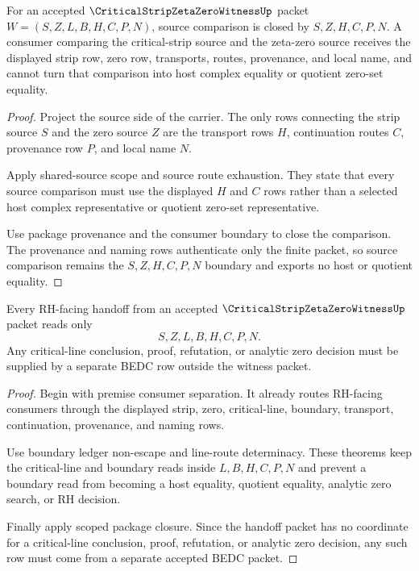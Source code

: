 \begin{theorem}
\label{thm:critical-strip-zeta-zero-source-boundary-closure}
For an accepted $\CriticalStripZetaZeroWitnessUp$ packet $W=(S,Z,L,B,H,C,P,N)$, source comparison is closed by $S,Z,H,C,P,N$. A consumer comparing the critical-strip source and the zeta-zero source receives the displayed strip row, zero row, transports, routes, provenance, and local name, and cannot turn that comparison into host complex equality or quotient zero-set equality.
\end{theorem}
\begin{proof}
Project the source side of the carrier. The only rows connecting the strip source $S$ and the zero source $Z$ are the transport rows $H$, continuation routes $C$, provenance row $P$, and local name $N$.

Apply shared-source scope and source route exhaustion. They state that every source comparison must use the displayed $H$ and $C$ rows rather than a selected host complex representative or quotient zero-set representative.

Use package provenance and the consumer boundary to close the comparison. The provenance and naming rows authenticate only the finite packet, so source comparison remains the $S,Z,H,C,P,N$ boundary and exports no host or quotient equality.
\end{proof}

\begin{theorem}
\label{thm:critical-strip-zeta-zero-rh-handoff-scope}
Every RH-facing handoff from an accepted $\CriticalStripZetaZeroWitnessUp$ packet reads only
$$
S,Z,L,B,H,C,P,N.
$$
Any critical-line conclusion, proof, refutation, or analytic zero decision must be supplied by a separate BEDC row outside the witness packet.
\end{theorem}
\begin{proof}
Begin with premise consumer separation. It already routes RH-facing consumers through the displayed strip, zero, critical-line, boundary, transport, continuation, provenance, and naming rows.

Use boundary ledger non-escape and line-route determinacy. These theorems keep the critical-line and boundary reads inside $L,B,H,C,P,N$ and prevent a boundary read from becoming a host equality, quotient equality, analytic zero search, or RH decision.

Finally apply scoped package closure. Since the handoff packet has no coordinate for a critical-line conclusion, proof, refutation, or analytic zero decision, any such row must come from a separate accepted BEDC packet.
\end{proof}

